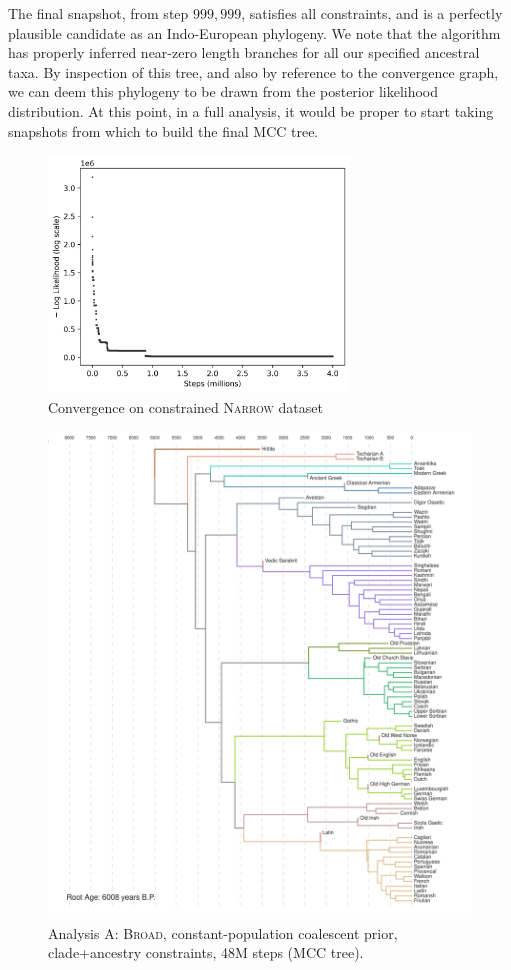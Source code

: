 \documentclass[10pt,journal,compsoc]{IEEEtran}
\begin{document}
The final snapshot, from step $999,999$, satisfies all constraints, and is a perfectly plausible candidate as an Indo-European phylogeny. We note that the algorithm has properly inferred near-zero length branches for all our specified ancestral taxa. By inspection of this tree, and also by reference to the convergence graph, we can deem this phylogeny to be drawn from the posterior likelihood distribution. At this point, in a full analysis, it would be proper to start taking snapshots from which to build the final MCC tree.

\begin{figure}
\caption{Convergence on constrained \textsc{Narrow} dataset}\label{fig:convergence}
\includegraphics[width=8cm,center]{convergence}
\end{figure}

\begin{figure}
    \caption{Analysis A: \textsc{Broad}, constant-population coalescent prior, clade+ancestry constraints, 48M steps (MCC tree).}\label{fig:analysisA}
    \includegraphics[width=\textwidth, center]{runs24-broad-constant}
\end{figure}
\end{document}
